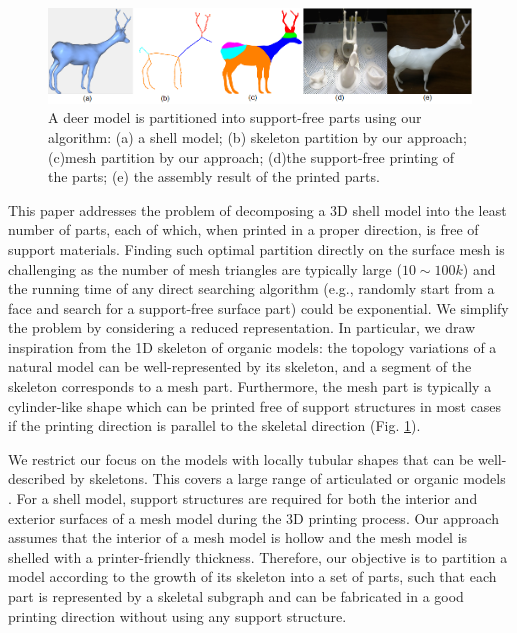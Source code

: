 \begin{figure}[t]
  \centering
  \includegraphics[width=\linewidth]{figs/tree_with_skeleton.png}
  \caption{\label{fig:ex1}%
  A deer model is partitioned into support-free parts using our algorithm: (a) a shell model; (b) skeleton partition by our approach; (c)mesh partition by our approach; (d)the support-free printing of the parts; (e) the assembly result of the printed parts.}
\end{figure}


This paper addresses the problem of decomposing a 3{D} shell model into the least number of parts, each of which, when printed in a proper direction, is free of support materials. {Finding such optimal partition directly on the surface mesh is challenging as the number of mesh triangles are typically large ($10\sim100k$) and the running time of any direct searching algorithm (e.g., randomly start from a face and search for a support-free surface part) could be exponential}. We simplify the problem by considering a reduced representation. In particular, we draw inspiration from the 1{D} skeleton of organic models: the topology variations of a natural model can be well-represented by its skeleton, and a {segment} of the skeleton corresponds to a mesh part. Furthermore, the mesh part is typically a cylinder-like shape which can be printed free of support structures in most cases if the printing direction is parallel to the skeletal direction (Fig. \ref{fig:ex1}).

We restrict our focus on {the models with locally tubular shapes that} can be well-described by skeletons. This covers a large range of articulated or organic models \cite{tagliasacchi2009curve}. {{For a shell model}}, support structures are required for both the interior and exterior surfaces of a mesh model during the 3{D} printing process. Our approach assumes that the interior of a mesh model is hollow and the mesh model is shelled with a printer-friendly thickness. Therefore, our objective is to partition a model according to the growth of its skeleton into a set of parts, such that each part is represented by a skeletal subgraph and can be fabricated in a good printing direction without using any support structure. %


